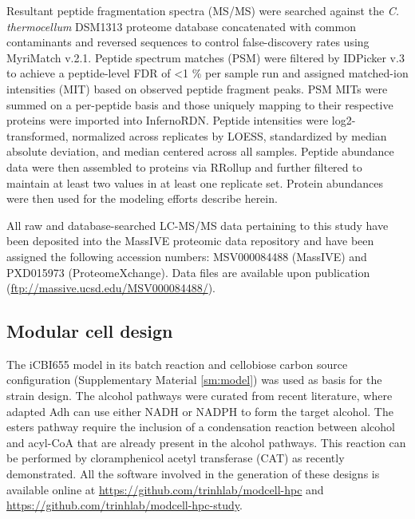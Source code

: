 Resultant peptide fragmentation spectra (MS/MS) were searched against the \textit{C. thermocellum} DSM1313 proteome database concatenated with common contaminants and reversed sequences to control false-discovery rates using MyriMatch v.2.1.\citep{tabb2007}
Peptide spectrum matches (PSM) were filtered by IDPicker v.3\citep{ma2009} to achieve a peptide-level FDR of \textless1 \% per sample run and assigned matched-ion intensities (MIT) based on observed peptide fragment peaks.
PSM MITs were summed on a per-peptide basis and those uniquely mapping to their respective proteins were imported into InfernoRDN.\citep{taverner2012}
Peptide intensities were log2-transformed, normalized across replicates by LOESS, standardized by median absolute deviation, and median centered across all samples. Peptide abundance data were then assembled to proteins via RRollup and further filtered to maintain at least two values in at least one replicate set. Protein abundances were then used for the modeling efforts describe herein.

All raw and database-searched LC-MS/MS data pertaining to this study have been deposited into the MassIVE proteomic data repository and have been assigned the following accession numbers: MSV000084488 (MassIVE) and PXD015973 (ProteomeXchange). Data files are available upon publication (\url{ftp://massive.ucsd.edu/MSV000084488/}).

\subsection{Modular cell design}
The iCBI655 model in its batch reaction and cellobiose carbon source configuration (Supplementary Material \ref{sm:model}) was used as basis for the strain design.
The alcohol pathways were curated from recent literature, \citep{holwerda2014, lin2015, loder2015} where adapted Adh can use either NADH or NADPH to form the target alcohol.\citep{biswas2015}
The esters pathway require the inclusion of a condensation reaction between alcohol and acyl-CoA that are already present in the alcohol pathways. This reaction can be performed by cloramphenicol acetyl transferase (CAT)  as recently demonstrated.\citep{seo2019}
All the software involved in the generation of these designs is available online at \url{https://github.com/trinhlab/modcell-hpc} and \url{https://github.com/trinhlab/modcell-hpc-study}.

